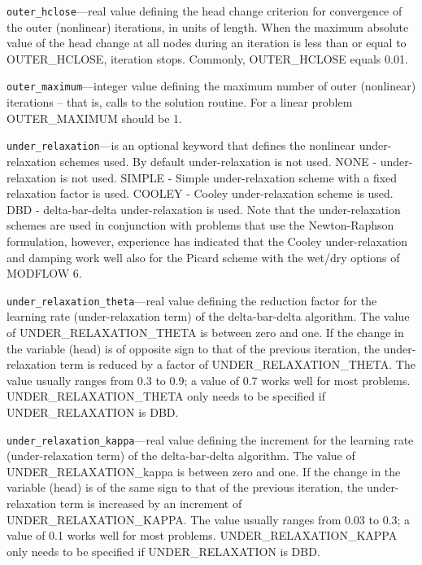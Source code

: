 \begin{description}
\item \texttt{outer\_hclose}---real value defining the head change criterion for convergence of the outer (nonlinear) iterations, in units of length. When the maximum absolute value of the head change at all nodes during an iteration is less than or equal to OUTER\_HCLOSE, iteration stops. Commonly, OUTER\_HCLOSE equals 0.01.

\item \texttt{outer\_maximum}---integer value defining the maximum number of outer (nonlinear) iterations -- that is, calls to the solution routine. For a linear problem OUTER\_MAXIMUM should be 1.

\item \texttt{under\_relaxation}---is an optional keyword that defines the nonlinear under-relaxation schemes used. By default under-relaxation is not used.  NONE - under-relaxation is not used. SIMPLE - Simple under-relaxation scheme with a fixed relaxation factor is used.  COOLEY - Cooley under-relaxation scheme is used.  DBD - delta-bar-delta under-relaxation is used.  Note that the under-relaxation schemes are used in conjunction with problems that use the Newton-Raphson formulation, however, experience has indicated that the Cooley under-relaxation and damping work well also for the Picard scheme with the wet/dry options of MODFLOW 6.

\item \texttt{under\_relaxation\_theta}---real value defining the reduction factor for the learning rate (under-relaxation term) of the delta-bar-delta algorithm. The value of UNDER\_RELAXATION\_THETA is between zero and one. If the change in the variable (head) is of opposite sign to that of the previous iteration, the under-relaxation term is reduced by a factor of UNDER\_RELAXATION\_THETA. The value usually ranges from 0.3 to 0.9; a value of 0.7 works well for most problems. UNDER\_RELAXATION\_THETA only needs to be specified if UNDER\_RELAXATION is DBD.

\item \texttt{under\_relaxation\_kappa}---real value defining the increment for the learning rate (under-relaxation term) of the delta-bar-delta algorithm. The value of UNDER\_RELAXATION\_kappa is between zero and one. If the change in the variable (head) is of the same sign to that of the previous iteration, the under-relaxation term is increased by an increment of UNDER\_RELAXATION\_KAPPA. The value usually ranges from 0.03 to 0.3; a value of 0.1 works well for most problems. UNDER\_RELAXATION\_KAPPA only needs to be specified if UNDER\_RELAXATION is DBD.


\end{description}
